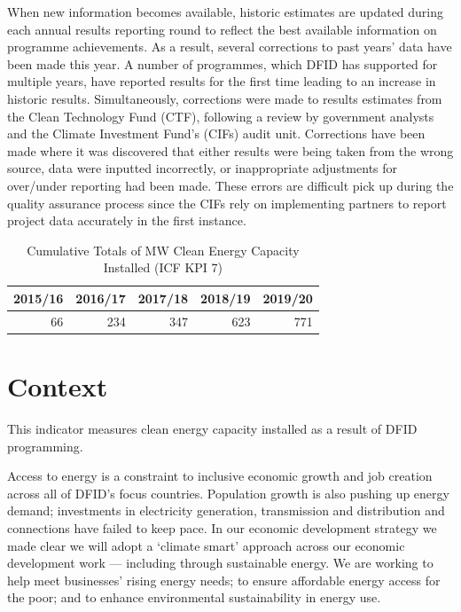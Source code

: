 When new information becomes available, historic estimates are updated during each annual results reporting round to reflect the best available information on programme achievements. %
As a result, several corrections to past years' data have been made this year. %
A number of programmes, which DFID has supported for multiple years, have reported results for the first time leading to an increase in historic results. %
Simultaneously, corrections were made to results estimates from the Clean Technology Fund (CTF), following a review by government analysts and the Climate Investment Fund's (CIFs) audit unit.  %
Corrections have been made where it was discovered that either results were being taken from the wrong source, data were inputted incorrectly, or inappropriate adjustments for over/under reporting had been made. %
These errors are difficult pick up during the quality assurance process since the CIFs rely on implementing partners to report project data accurately in the first instance. %

\begin{table}[htbp]
	\centering
  \caption{Cumulative Totals of MW Clean Energy Capacity Installed (ICF KPI 7)}\label{tab:energy}
	\begin{tabular}{rrrrr}
		\toprule
		\multicolumn{1}{c}{\textbf{2015/16}}&\multicolumn{1}{c}{\textbf{2016/17}}&\multicolumn{1}{c}{\textbf{2017/18}}&\multicolumn{1}{c}{\textbf{2018/19}}&\multicolumn{1}{c}{\textbf{2019/20}} \\ \hline
		\rule{0pt}{10pt}66 	  &      234 	&        347 	   &     623 	  &        771 \\ \bottomrule
	\end{tabular}
\end{table}

\section{Context}

This indicator measures clean energy capacity installed as a result of DFID
programming. %

Access to energy is a constraint to inclusive economic growth and job creation across all of DFID's focus countries. %
Population growth is also pushing up energy demand; investments in electricity generation, transmission and distribution and connections have failed to keep pace. %
In our economic development strategy we made clear we will adopt a `climate smart' approach across our economic development work --- including through sustainable energy. %
We are working to help meet businesses' rising energy needs; to ensure affordable energy access for the poor; and to enhance environmental sustainability in energy use. %


\newpage
